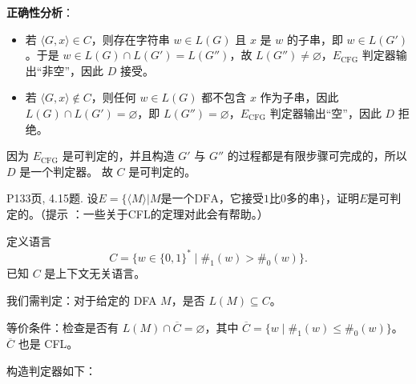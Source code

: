 \documentclass[11pt,addpoints,answers]{exam}
\begin{document}
\begin{questions}
\begin{solution}
        \textbf{正确性分析}：
        \begin{itemize}
            \item 若 \(\langle G, x \rangle \in C\)，则存在字符串 \(w \in L(G)\) 且 \(x\) 是 \(w\) 的子串，即 \(w \in L(G')\)。于是 \(w \in L(G) \cap L(G') = L(G'')\)，故 \(L(G'') \neq \varnothing\)，\(E_{\text{CFG}}\) 判定器输出“非空”，因此 \(D\) 接受。
            \item 若 \(\langle G, x \rangle \notin C\)，则任何 \(w \in L(G)\) 都不包含 \(x\) 作为子串，因此 \(L(G) \cap L(G') = \varnothing\)，即 \(L(G'') = \varnothing\)，\(E_{\text{CFG}}\) 判定器输出“空”，因此 \(D\) 拒绝。
        \end{itemize}
        
        因为 \(E_{\text{CFG}}\) 是可判定的，并且构造 \(G'\) 与 \(G''\) 的过程都是有限步骤可完成的，所以 \(D\) 是一个判定器。  
        故 \(C\) 是可判定的。
	\end{solution}  
	
	
	\question P133页, 4.15题.
	设$E=\{\langle M\rangle|M\text{是一个DFA，它接受1比0多的串\}，证明}E$是可判定的。（提示 ：一些关于CFL的定理对此会有帮助。）
	\begin{solution}
		定义语言 
        \[
        C = \{ w \in \{0,1\}^* \mid \#_1(w) > \#_0(w) \}.
        \]
        已知 \(C\) 是上下文无关语言。  
        
        我们需判定：对于给定的 DFA \(M\)，是否 \(L(M) \subseteq C\)。
        
        等价条件：检查是否有 \(L(M) \cap \overline{C} = \varnothing\)，其中 \(\overline{C} = \{ w \mid \#_1(w) \le \#_0(w) \}\)。  
        \(\overline{C}\) 也是 CFL。
        
        构造判定器如下：
        

\end{solution}
\end{questions}
\end{document}
